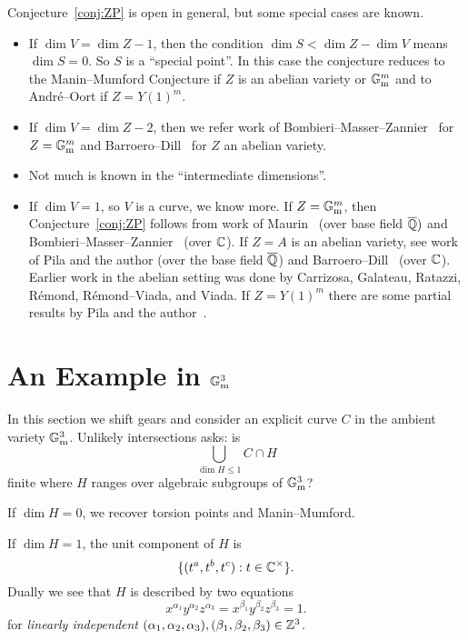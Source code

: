 \begin{example}
  Conjecture~\ref{conj:ZP} is open in general, but some special cases
  are known. 
  \begin{itemize}
  \item If $\dim V = \dim Z-1$, then the condition $\dim S < \dim Z -
    \dim V$ means $\dim S =0$. So $S$ is a ``special point''. In this
    case the conjecture reduces to the Manin--Mumford Conjecture if
    $Z$ is an abelian variety or ${\mathbb{G}}_{\mathrm{m}}^m$ and to
    Andr\'e--Oort if $Z=Y(1)^m$.
  \item If $\dim V = \dim Z-2$, then we refer  work of
    Bombieri--Masser--Zannier~\cite{BMZgeometric,BMZUnlikely} for $Z={\mathbb{G}}_{\mathrm{m}}^m$
    and
    Barroero--Dill~\cite{BarroeroDill:ENS} for $Z$ an abelian variety.
  \item Not much is known in the ``intermediate dimensions''.
  \item If $\dim V = 1$, so $V$ is a curve, we know more.
    If $Z={\mathbb{G}}_{\mathrm{m}}^m$, then Conjecture~\ref{conj:ZP} follows
    from work of Maurin~\cite{Maurin} (over base field ${\overline{\mathbb{Q}}})$ and
    Bombieri--Masser--Zannier~\cite{BMZUnlikely} (over ${\mathbb{C}}$).
    If $Z=A$ is an abelian variety, see work of Pila and the author
    \cite{HabeggerPilaENS} (over the base field ${\overline{\mathbb{Q}}}$) and
    Barroero--Dill~\cite{BarroeroDill:ENS}
    (over ${\mathbb{C}}$).
    Earlier work in the abelian setting
    was done by
    Carrizosa, Galateau, Ratazzi, R\'emond, R\'emond--Viada,  and Viada.
    If $Z=Y(1)^m$ there are some partial results by Pila
    and the author~\cite{HabeggerPila12}. 
  \end{itemize}
\end{example}

\section{An Example in ${\mathbb{G}}_{\mathrm{m}}^3$}

In this section we shift gears and consider
an explicit curve $C$ in  the ambient variety ${\mathbb{G}}_{\mathrm{m}}^3$.
Unlikely intersections asks:  is $$\bigcup_{\dim H \le 1} C\cap
H$$ finite where $H$ ranges over algebraic subgroups of
${\mathbb{G}}_{\mathrm{m}}^3$?

If $\dim H=0$, we recover torsion points and Manin--Mumford.

If $\dim H=1$, the unit component of $H$ is
\begin{equation*}
  \{(t^{a},t^{b},t^{c}) : t\in {\mathbb{C}}^\times \}. 
\end{equation*}
Dually we see that  $H$ is described by two equations
\begin{equation*}
  x^{\alpha_1} y^{\alpha_2} z^{\alpha_3} =
  x^{\beta_1} y^{\beta_2} z^{\beta_3} = 1.
\end{equation*}
for    \emph{linearly independent}
$(\alpha_1,\alpha_2,\alpha_3), (\beta_1,\beta_2,\beta_3)\in{\mathbb{Z}}^3$.


